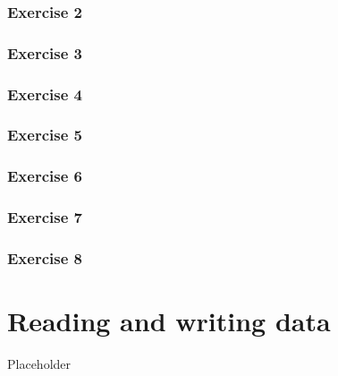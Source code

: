 \documentclass[]{gitbook}
\begin{document}
\hypertarget{exercise-2}{%
\subsubsection*{Exercise 2}\label{exercise-2}}

\hypertarget{exercise-3}{%
\subsubsection*{Exercise 3}\label{exercise-3}}

\hypertarget{exercise-4}{%
\subsubsection*{Exercise 4}\label{exercise-4}}

\hypertarget{exercise-5}{%
\subsubsection*{Exercise 5}\label{exercise-5}}

\hypertarget{exercise-6}{%
\subsubsection*{Exercise 6}\label{exercise-6}}

\hypertarget{exercise-7}{%
\subsubsection*{Exercise 7}\label{exercise-7}}

\hypertarget{exercise-8}{%
\subsubsection*{Exercise 8}\label{exercise-8}}

\hypertarget{reading-and-writing-data}{%
\section{Reading and writing data}\label{reading-and-writing-data}}

Placeholder
\end{document}
